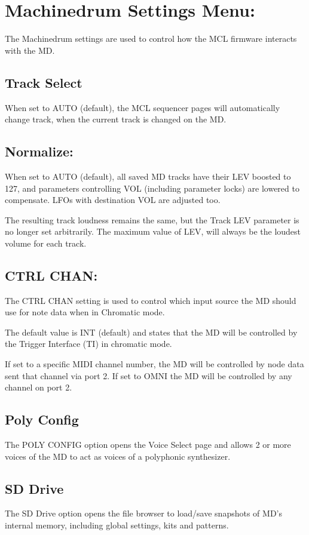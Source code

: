 \chapter{Machinedrum Settings Menu:}
The Machinedrum settings are used to control how the MCL firmware interacts with the MD.
\section{Track Select}
When set to AUTO (default), the MCL sequencer pages will automatically change track, when the current track is changed on the MD.

\section{Normalize:}
When set to AUTO (default), all saved MD tracks have their LEV boosted to 127, and parameters controlling VOL (including parameter locks) are lowered
to compensate. LFOs with destination VOL are 
adjusted too.

The resulting track loudness remains the same, but the Track LEV parameter is no longer set arbitrarily. The maximum value of LEV, will always be the loudest volume for each track.
\section{CTRL CHAN:}
The CTRL CHAN setting is used to control which input  source the MD should use for note data when in Chromatic mode.

The default value is INT (default) and states that the MD will be controlled by the Trigger Interface (TI) in chromatic mode.

If set to a specific MIDI channel number, the MD will be controlled by node data sent that channel via port 2. If set to OMNI the MD will be controlled by any channel on port 2.
\section{Poly Config}
The POLY CONFIG option opens the Voice Select page and allows 2 or more voices of the MD to act as voices of a polyphonic synthesizer.
\section{SD Drive}
The SD Drive option opens the file browser to load/save snapshots of MD's internal memory, including global settings, kits and patterns.